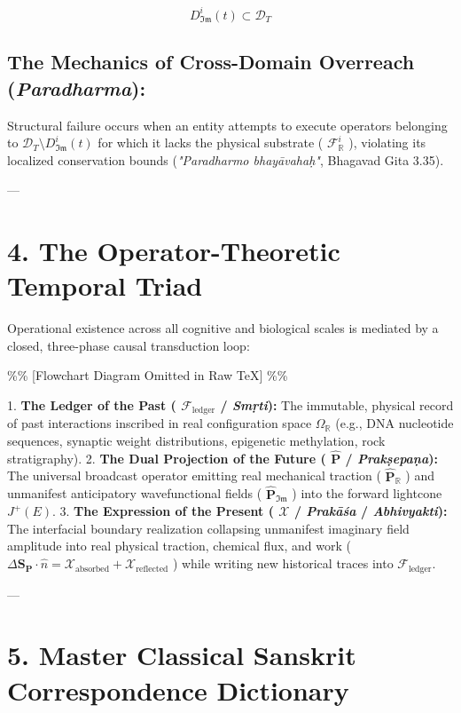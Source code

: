 \documentclass[11pt,a4paper]{article}
\theoremstyle{definition}
\theoremstyle{remark}
\begin{document}
\begin{equation}
\boxed{D_{\mathfrak{Im}}^i(t) \subset \mathcal{D}_T}
\end{equation}


\subsection{The Mechanics of Cross-Domain Overreach (\textit{Paradharma}):}
Structural failure occurs when an entity attempts to execute operators belonging to $\mathcal{D}_T \setminus D_{\mathfrak{Im}}^i(t)$ for which it lacks the physical substrate ( $\mathcal{F}_{\mathbb{R}}^i$ ), violating its localized conservation bounds (\textit{"Paradharmo bhayāvahaḥ"}, Bhagavad Gita 3.35).

---

\section{4. The Operator-Theoretic Temporal Triad}

Operational existence across all cognitive and biological scales is mediated by a closed, three-phase causal transduction loop:

\%\% [Flowchart Diagram Omitted in Raw TeX] \%\%

1. \textbf{The Ledger of the Past ( $\mathcal{F}_{\text{ledger}}$ / \textit{Smṛti}):}
The immutable, physical record of past interactions inscribed in real configuration space $\Omega_{\mathbb{R}}$ (e.g., DNA nucleotide sequences, synaptic weight distributions, epigenetic methylation, rock stratigraphy).
2. \textbf{The Dual Projection of the Future ( $\hat{\mathbf{P}}$ / \textit{Prakṣepaṇa}):}
The universal broadcast operator emitting real mechanical traction ( $\hat{\mathbf{P}}_{\mathbb{R}}$ ) and unmanifest anticipatory wavefunctional fields ( $\hat{\mathbf{P}}_{\mathfrak{Im}}$ ) into the forward lightcone $J^+(E)$.
3. \textbf{The Expression of the Present ( $\boldsymbol{\mathcal{X}}$ / \textit{Prakāśa} / \textit{Abhivyakti}):}
The interfacial boundary realization collapsing unmanifest imaginary field amplitude into real physical traction, chemical flux, and work ( $\Delta \mathbf{S}_{\mathbf{P}} \cdot \hat{n} = \mathcal{X}_{\text{absorbed}} + \mathcal{X}_{\text{reflected}}$ ) while writing new historical traces into $\mathcal{F}_{\text{ledger}}$.

---

\section{5. Master Classical Sanskrit Correspondence Dictionary}
\end{document}
